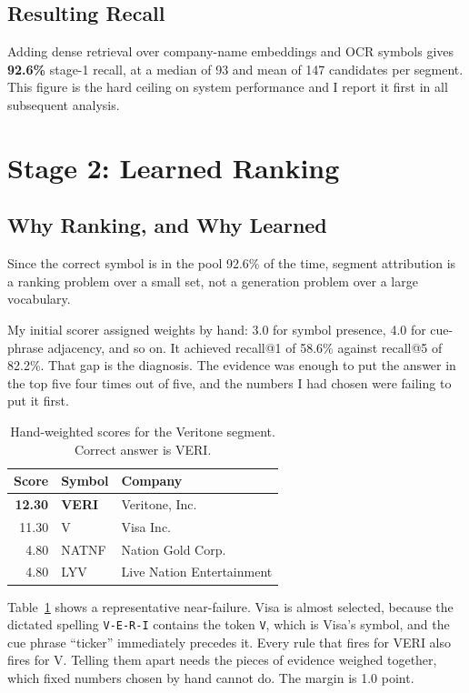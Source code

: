 \documentclass[conference]{IEEEtran}
\begin{document}
\subsection{Resulting Recall}

Adding dense retrieval over company-name embeddings and OCR symbols gives
\textbf{92.6\%} stage-1 recall, at a median of 93 and mean of 147 candidates per
segment. This figure is the hard ceiling on system performance and I report it
first in all subsequent analysis.

\section{Stage 2: Learned Ranking}
\label{sec:rank}

\subsection{Why Ranking, and Why Learned}

Since the correct symbol is in the pool 92.6\% of the time, segment attribution is
a ranking problem over a small set, not a generation problem over a large
vocabulary.

My initial scorer assigned weights by hand: 3.0 for symbol presence, 4.0 for
cue-phrase adjacency, and so on. It achieved recall@1 of 58.6\% against
recall@5 of 82.2\%. That gap is the diagnosis. The evidence was enough to put
the answer in the top five four times out of five, and the numbers I had chosen
were failing to put it first.

\begin{table}[htbp]
\caption{Hand-weighted scores for the Veritone segment. Correct answer is VERI.}
\label{tab:veri}
\centering
\begin{tabular}{rll}
\toprule
Score & Symbol & Company \\
\midrule
\textbf{12.30} & \textbf{VERI} & Veritone, Inc. \\
11.30 & V & Visa Inc. \\
4.80 & NATNF & Nation Gold Corp. \\
4.80 & LYV & Live Nation Entertainment \\
\bottomrule
\end{tabular}
\end{table}

Table~\ref{tab:veri} shows a representative near-failure. Visa is almost
selected, because the dictated spelling \texttt{V-E-R-I} contains the token
\texttt{V}, which is Visa's symbol, and the cue phrase ``ticker'' immediately
precedes it. Every rule that fires for VERI also fires for V. Telling them apart
needs the pieces of evidence weighed together, which fixed numbers chosen by
hand cannot do. The margin is 1.0 point.
\end{document}
